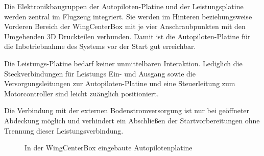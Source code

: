 Die Elektronikbaugruppen der Autopiloten-Platine und der Leistungsplatine werden zentral im Flugzeug integriert. Sie werden im Hinteren beziehungsweise Vorderen Bereich der WingCenterBox mit je vier Anschraubpunkten mit den Umgebenden 3D Druckteilen verbunden.
Damit ist die Autopiloten-Platine für die Inbetriebnahme des Systems vor der Start gut erreichbar.

Die Leistungs-Platine bedarf keiner unmittelbaren Interaktion. Lediglich die Steckverbindungen für Leistungs Ein- und Ausgang sowie die Versorgungsleitungen zur Autopiloten-Platine und eine Steuerleitung zum Motorcontroller sind leicht zuänglich positioniert.

Die Verbindung mit der externen Bodenstromversorgung ist nur bei geöffneter Abdeckung möglich und verhindert ein Abschließen der Startvorbereitungen ohne Trennung dieser Leistungsverbindung.

\begin{figure}[H]
\centering
{}
\caption{In der WingCenterBox eingebaute Autopilotenplatine} 
\label{fig:In der WingCenterBox eingebaute Autopilotenplatine}
\end{figure}